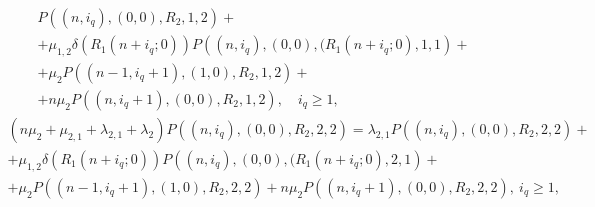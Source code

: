 \documentclass[default]{subfiles}
\begin{document}
{\begin{multline}
  P\left((n,i_q),(0,0),R_2,1,2\right)+ \\+
  \mu_{1,2}\delta\left(R_1(n+i_q;0)\right)
  P\left((n,i_q),(0,0),(R_1(n+i_q;0),1,1\right)+\\ +
  \mu_2 P\left((n-1,i_q+1),(1,0),R_2,1,2\right)+ \\+ n\mu_2
  P\left((n,i_q+1),(0,0),R_2,1,2\right), \quad i_q\geqslant 1,
\label{eq:4.3}
\end{multline}
\begin{multline}
  \left(n\mu_2+\mu_{2,1}+\lambda_{2,1}+\lambda_2\right)
  P\left((n,i_q),(0,0),R_2,2,2\right) =  \lambda_{2,1}
  P\left((n,i_q),(0,0),R_2,2,2\right)+ \\ +
  \mu_{1,2}\delta\left(R_1(n+i_q;0)\right)
  P\left((n,i_q),(0,0),(R_1(n+i_q;0),2,1\right)+\\ +
  \mu_2 P\left((n-1,i_q+1),(1,0),R_2,2,2\right)+ n\mu_2
  P\left((n,i_q+1),(0,0),R_2,2,2\right), \ i_q\geqslant 1,
\label{eq:4.4}
\end{multline}

}
\end{document}
